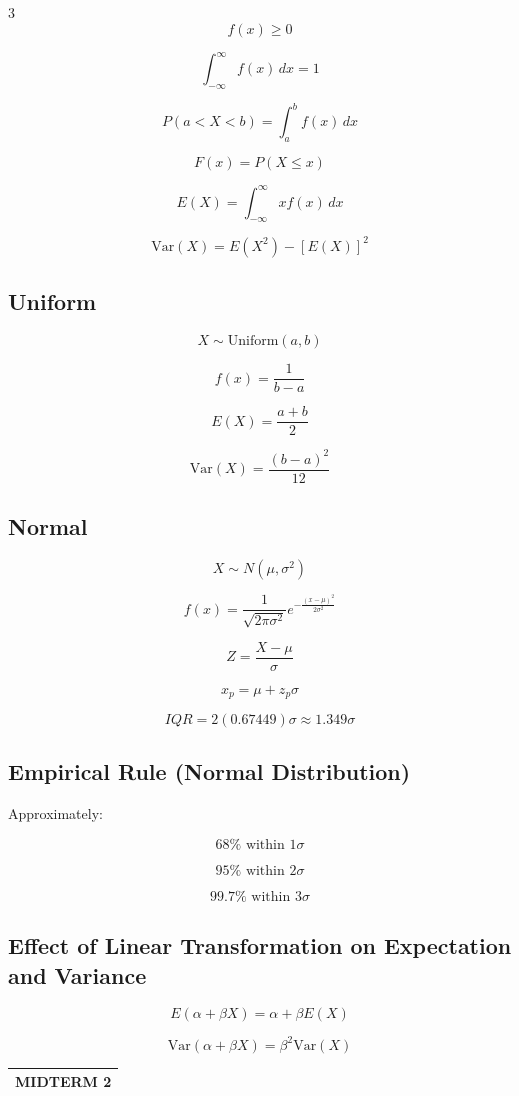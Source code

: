\documentclass[10pt]{article}
\makeatletter
\newcommand{\termheader}[1]{%
  \par\noindent
  \begin{tabular}{@{}p{\linewidth}@{}}
    \small\bfseries\uppercase{#1} \\ \hline
  \end{tabular}
  \par\vspace{0pt}
}
\makeatother
\begin{document}
\begin{multicols}{3}
\[
f(x) \ge 0
\]

\[
\int_{-\infty}^{\infty} f(x)\,dx = 1
\]

\[
P(a < X < b) = \int_a^b f(x)\,dx
\]

\[
F(x) = P(X \le x)
\]

\[
E(X) = \int_{-\infty}^{\infty} x f(x)\,dx
\]

\[
\mathrm{Var}(X) = E(X^2) - [E(X)]^2
\]

\subsection*{Uniform}

\[
X \sim \mathrm{Uniform}(a,b)
\]

\[
f(x) = \frac{1}{b-a}
\]

\[
E(X) = \frac{a+b}{2}
\]

\[
\mathrm{Var}(X) = \frac{(b-a)^2}{12}
\]

\subsection*{Normal}

\[
X \sim N(\mu, \sigma^2)
\]

\[
f(x) =
\frac{1}{\sqrt{2\pi\sigma^2}}
e^{-\frac{(x-\mu)^2}{2\sigma^2}}
\]

\[
Z = \frac{X - \mu}{\sigma}
\]

\[
x_p = \mu + z_p \sigma
\]

\[
IQR = 2(0.67449)\sigma \approx 1.349\sigma
\]

\subsection*{Empirical Rule (Normal Distribution)}

Approximately:

\[
68\% \text{ within } 1\sigma
\]

\[
95\% \text{ within } 2\sigma
\]

\[
99.7\% \text{ within } 3\sigma
\]

\subsection*{Effect of Linear Transformation on Expectation and Variance}

\[
E(\alpha + \beta X) = \alpha + \beta E(X)
\]

\[
\mathrm{Var}(\alpha + \beta X) = \beta^2 \mathrm{Var}(X)
\]
\termheader{Midterm 2}

\end{multicols}
\end{document}

